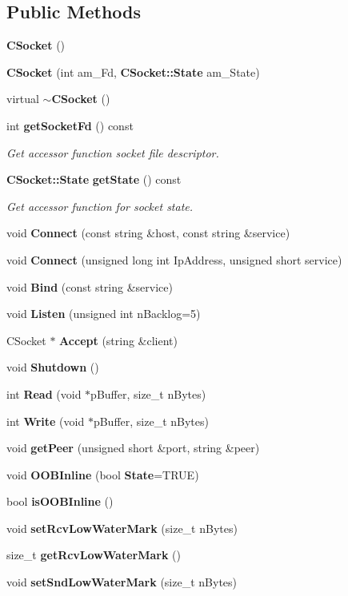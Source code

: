 \subsection*{Public Methods}
\begin{CompactItemize}
\item 
{\bf CSocket} ()
\item 
{\bf CSocket} (int am\_\-Fd, {\bf CSocket::State} am\_\-State)
\item 
virtual {\bf $\sim$CSocket} ()
\item 
int {\bf get\-Socket\-Fd} () const
\begin{CompactList}\small\item\em Get accessor function socket file descriptor.\item\end{CompactList}\item 
{\bf CSocket::State} {\bf get\-State} () const
\begin{CompactList}\small\item\em Get accessor function for socket state.\item\end{CompactList}\item 
void {\bf Connect} (const string \&host, const string \&service)
\item 
void {\bf Connect} (unsigned long int Ip\-Address, unsigned short service)
\item 
void {\bf Bind} (const string \&service)
\item 
void {\bf Listen} (unsigned int n\-Backlog=5)
\item 
CSocket $\ast$ {\bf Accept} (string \&client)
\item 
void {\bf Shutdown} ()
\item 
int {\bf Read} (void $\ast$p\-Buffer, size\_\-t n\-Bytes)
\item 
int {\bf Write} (void $\ast$p\-Buffer, size\_\-t n\-Bytes)
\item 
void {\bf get\-Peer} (unsigned short \&port, string \&peer)
\item 
void {\bf OOBInline} (bool {\bf State}=TRUE)
\item 
bool {\bf is\-OOBInline} ()
\item 
void {\bf set\-Rcv\-Low\-Water\-Mark} (size\_\-t n\-Bytes)
\item 
size\_\-t {\bf get\-Rcv\-Low\-Water\-Mark} ()
\item 
void {\bf set\-Snd\-Low\-Water\-Mark} (size\_\-t n\-Bytes)
\item 

\end{CompactItemize}
